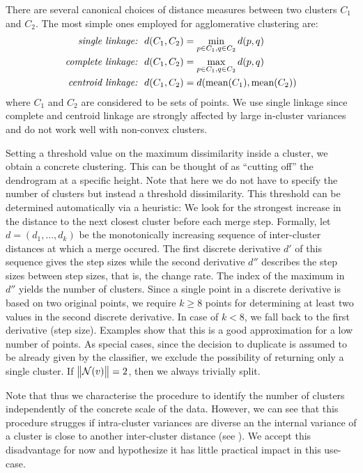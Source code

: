 \documentclass[
	fontsize=10pt, %
	twoside=true, %
	secnumdepth=1, %
  toc=indentunnumbered %
]{kaobook}
\begin{document}
There are several canonical choices of distance measures between two clusters $C_1$ and
$C_2$. The most simple ones employed for agglomerative clustering are:
\begin{align*}
  \text{{\textit{{single linkage:}}}} &~~ d(C_1, C_2) = \min_{p \in C_1, q \in C_2} d(p,q) \\
  \text{{\textit{{complete linkage:}}}} &~~ d(C_1, C_2) = \max_{p \in C_1, q \in C_2} d(p,q) \\
  \text{{\textit{{centroid linkage:}}}} &~~ d(C_1, C_2) = d(\text{mean}(C_1),\text{mean}(C_2))
\end{align*}
where $C_1$ and $C_2$ are considered to be sets of points. We use single linkage
since complete and centroid linkage are strongly affected by large in-cluster
variances and do not work well with non-convex clusters.

Setting a threshold value on the maximum dissimilarity inside a cluster, we
obtain a concrete clustering. This can be thought of as ``cutting off'' the
dendrogram at a specific height. Note that here we do not have to specify the
number of clusters but instead a threshold dissimilarity. This threshold can be
determined automatically via a heuristic:
We look for the strongest increase in the distance to the next closest cluster
before each merge step. Formally, let $d = (d_1, ..., d_k)$ be the monotonically
increasing sequence of inter-cluster distances at which a merge occured. The
first discrete derivative $d'$ of this sequence gives the step sizes while the
second derivative $d''$ describes the step sizes between step sizes, that is,
the change rate. The index of the maximum in $d''$ yields the number of
clusters. Since a single point in a discrete derivative is based on two original
points, we require $k \geq 8$ points for determining at least two
values in the second discrete derivative. In case of $k < 8$, we fall back to
the first derivative (step size). Examples show that this is a good
approximation for a low number of points.
%
As special cases, since the decision to duplicate is assumed to be already given
by the classifier, we exclude the possibility of returning only a single
cluster. If~$\norm{\mathcal{N}(v)}=2$, then we always trivially split. 

Note that thus we characterise the procedure to identify the number of clusters
independently of the concrete scale of the data. However,
we can see that this procedure strugges if
intra-cluster variances are diverse an the internal variance of a
cluster is close to another inter-cluster distance (see ).
We accept this disadvantage
for now and hypothesize it has little practical impact in this use-case.
\end{document}
